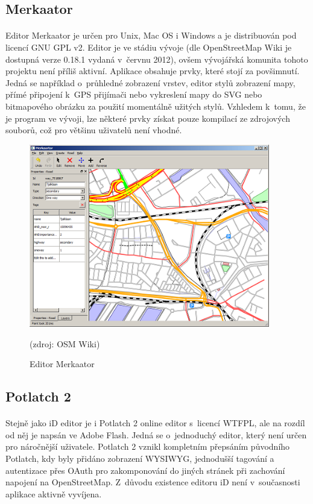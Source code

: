 \documentclass[11pt,a4paper,titlepage,oneside]{book}
\begin{document}
		\subsection{Merkaator}
			\paragraph{} Editor Merkaator je určen pro Unix, Mac OS i Windows a je distribuován pod licencí GNU \ac{GPL} v2. Editor je ve stádiu vývoje (dle OpenStreetMap Wiki je dostupná verze 0.18.1 vydaná v~červnu 2012), ovšem vývojářská komunita tohoto projektu není příliš aktivní\cite{wiki_merkaator}. Aplikace obsahuje prvky, které stojí za povšimnutí. Jedná se například o~průhledné zobrazení vrstev, editor stylů zobrazení mapy, přímé připojení k~GPS přijímači nebo vykreslení mapy do \ac{SVG} nebo bitmapového obrázku za použití momentálně užitých stylů. Vzhledem k~tomu, že je program ve vývoji, lze některé prvky získat pouze kompilací ze zdrojových souborů, což pro většinu uživatelů není vhodné.

		\begin{figure}[!h]
			\begin{center}
				\includegraphics[width=10.5cm]{obrazky/merkaator_osm.png}
				\caption{Editor Merkaator} (zdroj: OSM Wiki\cite{wiki_merkaator})
			\end{center}
		\end{figure}

		\subsection{Potlatch 2}
			\paragraph{} Stejně jako iD editor je i Potlatch 2 online editor s~licencí \ac{WTFPL}, ale na rozdíl od něj je napsán ve Adobe Flash. Jedná se o~jednoduchý editor, který není určen pro náročnější uživatele. Potlatch 2 vznikl kompletním přepsáním původního Potlatch\cite{wiki_p2}, kdy byly přidáno zobrazení \ac{WYSIWYG}, jednodušší tagování a autentizace přes OAuth pro zakomponování do jiných stránek při zachování napojení na OpenStreetMap. Z~důvodu existence editoru iD není v~současnosti aplikace aktivně vyvíjena.
\end{document}
